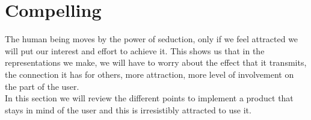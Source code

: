 \newpage
\section{Compelling}
The human being moves by the power of seduction, only if we feel attracted we will put our interest
and effort to achieve it. This shows us that in the representations we make, we will have to worry
about the effect that it transmits, the connection it has for others, more attraction, more level
of involvement on the part of the user.\\


In this section we will review the different points to implement a product that stays in mind
of the user and this is irresistibly attracted to use it.





